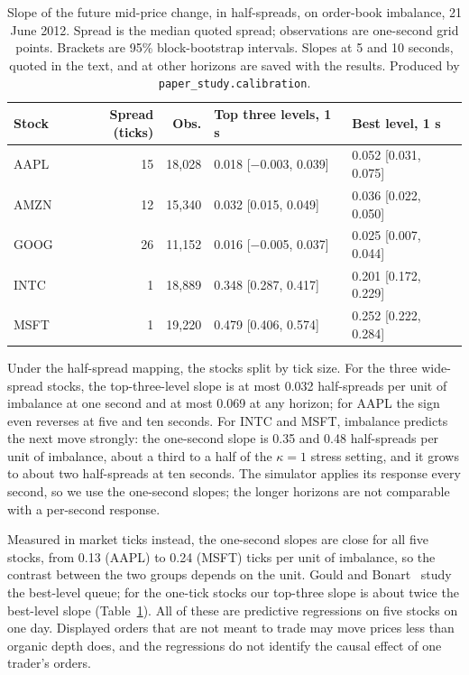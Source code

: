 \documentclass{article}
\begin{document}
\begin{table}[htbp]
\centering
\footnotesize
\setlength{\tabcolsep}{2.5pt}
\begin{tabular}{lrrll}
\toprule
\textbf{Stock} & \textbf{Spread (ticks)} & \textbf{Obs.} & \textbf{Top three levels, 1 s} & \textbf{Best level, 1 s} \\
\midrule
AAPL & 15 & 18,028 & 0.018 [$-$0.003, 0.039] & 0.052 [0.031, 0.075] \\
AMZN & 12 & 15,340 & 0.032 [0.015, 0.049] & 0.036 [0.022, 0.050] \\
GOOG & 26 & 11,152 & 0.016 [$-$0.005, 0.037] & 0.025 [0.007, 0.044] \\
\midrule
INTC & 1 & 18,889 & 0.348 [0.287, 0.417] & 0.201 [0.172, 0.229] \\
MSFT & 1 & 19,220 & 0.479 [0.406, 0.574] & 0.252 [0.222, 0.284] \\
\bottomrule
\end{tabular}
\caption{Slope of the future mid-price change, in half-spreads, on order-book imbalance, 21 June 2012. Spread is the median quoted spread; observations are one-second grid points. Brackets are 95\% block-bootstrap intervals. Slopes at 5 and 10 seconds, quoted in the text, and at other horizons are saved with the results. Produced by \texttt{paper\_study.calibration}.}
\label{tab:calibration}
\end{table}

Under the half-spread mapping, the stocks split by tick size. For the three wide-spread stocks, the top-three-level slope is at most 0.032 half-spreads per unit of imbalance at one second and at most 0.069 at any horizon; for AAPL the sign even reverses at five and ten seconds. For INTC and MSFT, imbalance predicts the next move strongly: the one-second slope is 0.35 and 0.48 half-spreads per unit of imbalance, about a third to a half of the $\kappa = 1$ stress setting, and it grows to about two half-spreads at ten seconds. The simulator applies its response every second, so we use the one-second slopes; the longer horizons are not comparable with a per-second response.

Measured in market ticks instead, the one-second slopes are close for all five stocks, from 0.13 (AAPL) to 0.24 (MSFT) ticks per unit of imbalance, so the contrast between the two groups depends on the unit. Gould and Bonart~\cite{r31} study the best-level queue; for the one-tick stocks our top-three slope is about twice the best-level slope (Table~\ref{tab:calibration}). All of these are predictive regressions on five stocks on one day. Displayed orders that are not meant to trade may move prices less than organic depth does, and the regressions do not identify the causal effect of one trader's orders.
\end{document}
